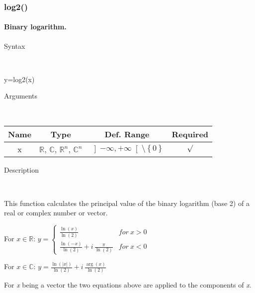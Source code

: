 \newpage
\subsubsection*{\hypertarget{log2}{}{\Large log2()}}


\paragraph{\label{par:Binary-logarithm}Binary logarithm.}

\begin{description}
\item [Syntax]~
\end{description}
y=log2(x)

\begin{description}
\item [Arguments]~
\end{description}
\begin{tabular}{|c|c|c|c|}
\hline 
Name&
Type&
Def. Range&
Required\tabularnewline
\hline
\hline 
x&
$\mathbb{R}$, $\mathbb{C}$, $\mathbb{R}^{n}$, $\mathbb{C}^{n}$&
$\left]-\infty,+\infty\right[\setminus\left\{ 0\right\} $&
$\surd$\tabularnewline
\hline
\end{tabular}

\begin{description}
\item [Description]~
\end{description}
This function calculates the principal value of the binary logarithm
(base 2) of a real or complex number or vector.

\medskip{}
For $x\in\mathbb{R}$: $y=\left\{ \begin{array}{cc}
{\displaystyle \frac{\ln\left(x\right)}{\ln\left(2\right)}} & for\: x>0\\
{\displaystyle \frac{\ln\left(-x\right)}{\ln\left(2\right)}}+i\,{\displaystyle \frac{\pi}{\ln\left(2\right)}} & for\: x<0\end{array}\right.$

\medskip{}
For $x\in\mathbb{C}$: $y={\displaystyle \frac{\ln\left(\left|x\right|\right)}{\ln\left(2\right)}}+i\,{\displaystyle \frac{\arg\left(x\right)}{\ln\left(2\right)}}$
\medskip{}

\noindent For \textit{x} being a vector the two equations above are
applied to the components of \textit{x}.

